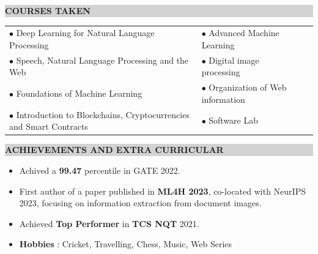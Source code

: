 \documentclass[a4paper,10.5pt]{article}
\newcommand{\resheading}[1]{{\small \colorbox{lightgray}{\begin{minipage}{0.975\textwidth}{\textbf{#1 \vphantom{p\^{E}}}}\end{minipage}}}}
\begin{document}
\resheading{\textbf{COURSES TAKEN}}
\begin{flushleft}
\vspace{-0.35cm}
\begin{tabular}{p{11.5cm}p{10cm}l}
\hspace{4.25mm} $\bullet$\hspace{0.7mm} Deep Learning for Natural Language Processing  & \qquad $\bullet$\hspace{0.7mm} Advanced Machine Learning\\

\hspace{4.25mm} $\bullet$\hspace{0.7mm} Speech, Natural Language Processing and the Web & \qquad $\bullet$\hspace{0.7mm} Digital image processing\\

\hspace{4.25mm} $\bullet$\hspace{0.7mm} Foundations of Machine Learning & \qquad $\bullet$\hspace{0.7mm} Organization of Web information \\

\hspace{4.25mm} $\bullet$\hspace{0.7mm} Introduction to Blockchains, Cryptocurrencies and Smart Contracts & \qquad $\bullet$\hspace{0.15mm} Software Lab \\
\end{tabular}
\vspace{-0.19cm}
\end{flushleft}

\resheading{\textbf{ACHIEVEMENTS AND EXTRA CURRICULAR}}
\vspace{-0.1cm}

\begin{itemize}[noitemsep,nolistsep]
    \item Achived a \textbf{99.47} percentile in GATE 2022.
    \vspace{0.05cm}
    \item First author of a paper published in \textbf{ML4H 2023}, co-located with NeurIPS 2023, focusing on information extraction from document images.
    \vspace{0.05cm}
    \item Achieved \textbf{Top Performer} in \textbf{TCS NQT} 2021.
    \vspace{0.05cm}
    \item \textbf{Hobbies} : Cricket, Travelling, Chess, Music, Web Series
\end{itemize}
\end{document}
